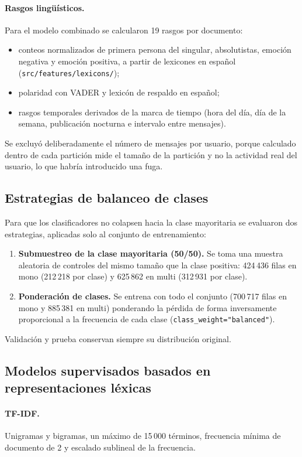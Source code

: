 \documentclass[12pt,a4paper]{article}
\begin{document}
\paragraph{Rasgos lingüísticos.} Para el modelo combinado se calcularon 19 rasgos por documento:
\begin{itemize}[leftmargin=2em]
    \item conteos normalizados de primera persona del singular, absolutistas, emoción negativa y emoción positiva, a partir de lexicones en español (\texttt{src/features/lexicons/});
    \item polaridad con VADER y lexicón de respaldo en español;
    \item rasgos temporales derivados de la marca de tiempo (hora del día, día de la semana, publicación nocturna e intervalo entre mensajes).
\end{itemize}
Se excluyó deliberadamente el número de mensajes por usuario, porque calculado dentro de cada partición mide el tamaño de la partición y no la actividad real del usuario, lo que habría introducido una fuga.

\subsection{Estrategias de balanceo de clases}
\label{sec:balanceo}
Para que los clasificadores no colapsen hacia la clase mayoritaria se evaluaron dos estrategias, aplicadas solo al conjunto de entrenamiento:
\begin{enumerate}[leftmargin=2em]
    \item \textbf{Submuestreo de la clase mayoritaria (50/50).} Se toma una muestra aleatoria de controles del mismo tamaño que la clase positiva: 424\,436 filas en mono (212\,218 por clase) y 625\,862 en multi (312\,931 por clase).
    \item \textbf{Ponderación de clases.} Se entrena con todo el conjunto (700\,717 filas en mono y 885\,381 en multi) ponderando la pérdida de forma inversamente proporcional a la frecuencia de cada clase (\texttt{class\_weight="balanced"}).
\end{enumerate}
Validación y prueba conservan siempre su distribución original.

\subsection{Modelos supervisados basados en representaciones léxicas}
\label{sec:baselines}
\paragraph{TF-IDF.} Unigramas y bigramas, un máximo de 15\,000 términos, frecuencia mínima de documento de 2 y escalado sublineal de la frecuencia.
\end{document}
